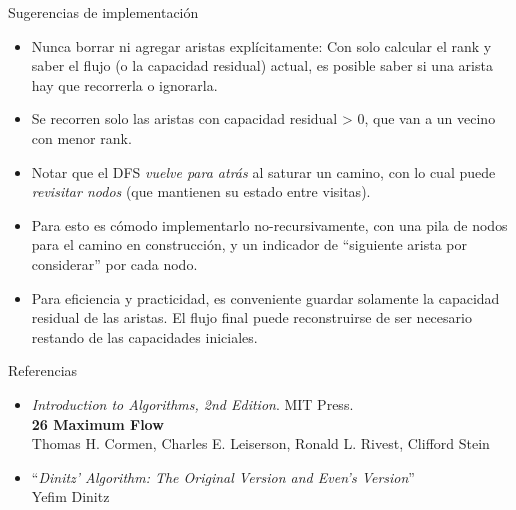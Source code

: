 \documentclass{beamer}
\begin{document}
\begin{frame}{Sugerencias de implementación}
    \begin{itemize}
        \item Nunca borrar ni agregar aristas explícitamente: Con solo calcular el rank y saber el flujo (o la capacidad residual) actual, es posible saber si una arista hay que recorrerla o ignorarla.
        \item Se recorren solo las aristas con capacidad residual > 0, que van a un vecino con menor rank.
        \item Notar que el DFS \textit{vuelve para atrás} al saturar un camino, con lo cual puede \textit{revisitar nodos} (que mantienen su estado entre visitas).
        \item Para esto es cómodo implementarlo no-recursivamente, con una pila de nodos para el camino en construcción,
                y un indicador de ``siguiente arista por considerar'' por cada nodo.
        \item Para eficiencia y practicidad, es conveniente guardar solamente la capacidad residual de las aristas.
               El flujo final puede reconstruirse de ser necesario restando de las capacidades iniciales.
    \end{itemize}
\end{frame}

\begin{frame}{Referencias}
    \begin{itemize}
        \item \textit{Introduction to Algorithms, 2nd Edition}. MIT Press. \\ \textbf{26 Maximum Flow} \\ Thomas H. Cormen, Charles E. Leiserson, Ronald L. Rivest, Clifford Stein
        \item ``\textit{Dinitz' Algorithm: The Original Version and Even's Version}'' \\ Yefim Dinitz
    \end{itemize}
\end{frame}
\end{document}
